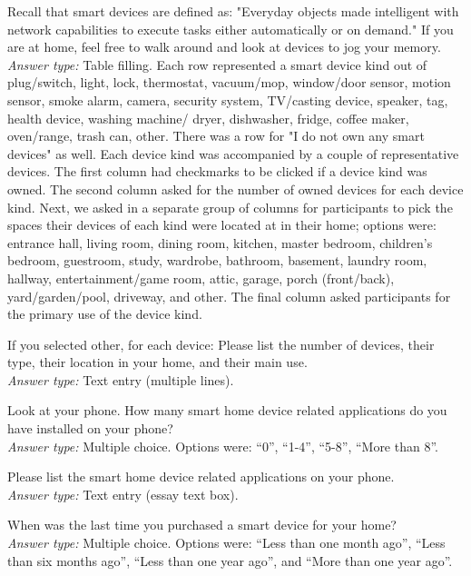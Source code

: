 Recall that smart devices are defined as: "Everyday objects made intelligent with network capabilities to execute tasks either automatically or on demand."
If you are at home, feel free to walk around and look at devices to jog your memory.\\
\textit{Answer type:} Table filling. Each row represented a smart device kind out of plug/switch, light, lock, thermostat, vacuum/mop, window/door sensor, motion sensor, smoke alarm, camera, security system, TV/casting device, speaker, tag, health device, washing machine/ dryer, dishwasher, fridge, coffee maker, oven/range, trash can, other. There was a row for "I do not own any smart devices" as well. Each device kind was accompanied by a couple of representative devices. The first column had checkmarks to be clicked if a device kind was owned. The second column asked for the number of owned devices for each device kind. Next, we asked in a separate group of columns for participants to pick the spaces their devices of each kind were located at in their home; options were: entrance hall, living room, dining room, kitchen, master bedroom, children's bedroom, guestroom, study, wardrobe, bathroom, basement, laundry room, hallway, entertainment/game room, attic, garage, porch (front/back), yard/garden/pool, driveway, and other. The final column asked participants for the primary use of the device kind.

\printQcounter{} If you selected other, for each device:
Please list the number of devices, their type, their location in your home, and their main use. \\
\textit{Answer type:} Text entry (multiple lines).

 Look at your phone. How many smart home device related applications do you have installed on your phone? \\
\textit{Answer type:} Multiple choice. Options were: ``0'', ``1-4'', ``5-8'', ``More than 8''.

 Please list the smart home device related applications on your phone.\\
\textit{Answer type:} Text entry (essay text box).

\printQcounter{} When was the last time you purchased a smart device for your home? \\
\textit{Answer type:} Multiple choice. Options were: ``Less than one month ago'', ``Less than six months ago'', ``Less than one year ago'', and ``More than one year ago''.

